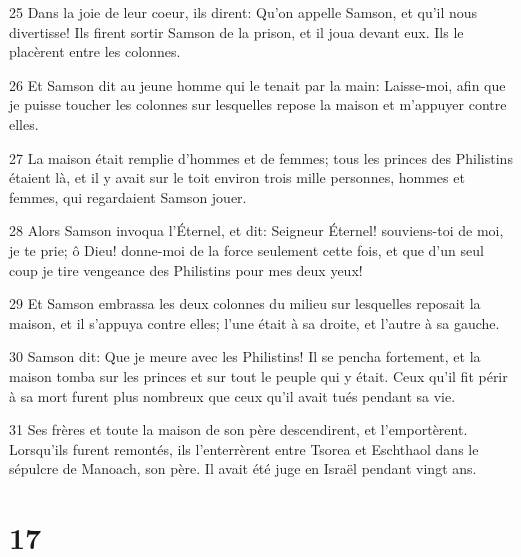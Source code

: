 \par 25 Dans la joie de leur coeur, ils dirent: Qu'on appelle Samson, et qu'il nous divertisse! Ils firent sortir Samson de la prison, et il joua devant eux. Ils le placèrent entre les colonnes.
\par 26 Et Samson dit au jeune homme qui le tenait par la main: Laisse-moi, afin que je puisse toucher les colonnes sur lesquelles repose la maison et m'appuyer contre elles.
\par 27 La maison était remplie d'hommes et de femmes; tous les princes des Philistins étaient là, et il y avait sur le toit environ trois mille personnes, hommes et femmes, qui regardaient Samson jouer.
\par 28 Alors Samson invoqua l'Éternel, et dit: Seigneur Éternel! souviens-toi de moi, je te prie; ô Dieu! donne-moi de la force seulement cette fois, et que d'un seul coup je tire vengeance des Philistins pour mes deux yeux!
\par 29 Et Samson embrassa les deux colonnes du milieu sur lesquelles reposait la maison, et il s'appuya contre elles; l'une était à sa droite, et l'autre à sa gauche.
\par 30 Samson dit: Que je meure avec les Philistins! Il se pencha fortement, et la maison tomba sur les princes et sur tout le peuple qui y était. Ceux qu'il fit périr à sa mort furent plus nombreux que ceux qu'il avait tués pendant sa vie.
\par 31 Ses frères et toute la maison de son père descendirent, et l'emportèrent. Lorsqu'ils furent remontés, ils l'enterrèrent entre Tsorea et Eschthaol dans le sépulcre de Manoach, son père. Il avait été juge en Israël pendant vingt ans.

\chapter{17}


